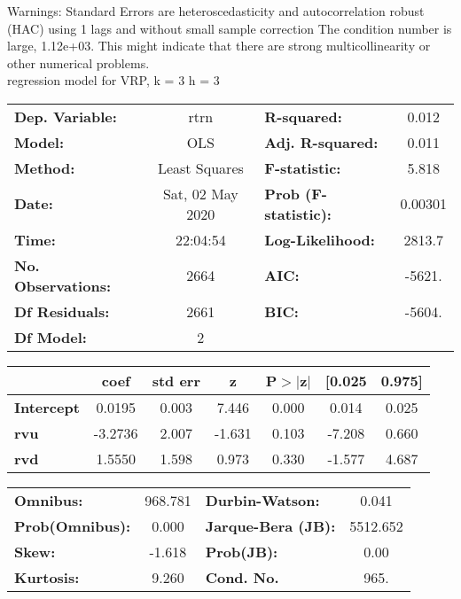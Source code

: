 Warnings: \newline
 [1] Standard Errors are heteroscedasticity and autocorrelation robust (HAC) using 1 lags and without small sample correction \newline
 [2] The condition number is large, 1.12e+03. This might indicate that there are \newline
 strong multicollinearity or other numerical problems.\\ 

regression model for VRP, k = 3 h = 3\begin{center}
\begin{tabular}{lclc}
\toprule
\textbf{Dep. Variable:}    &       rtrn       & \textbf{  R-squared:         } &     0.012   \\
\textbf{Model:}            &       OLS        & \textbf{  Adj. R-squared:    } &     0.011   \\
\textbf{Method:}           &  Least Squares   & \textbf{  F-statistic:       } &     5.818   \\
\textbf{Date:}             & Sat, 02 May 2020 & \textbf{  Prob (F-statistic):} &  0.00301    \\
\textbf{Time:}             &     22:04:54     & \textbf{  Log-Likelihood:    } &    2813.7   \\
\textbf{No. Observations:} &        2664      & \textbf{  AIC:               } &    -5621.   \\
\textbf{Df Residuals:}     &        2661      & \textbf{  BIC:               } &    -5604.   \\
\textbf{Df Model:}         &           2      & \textbf{                     } &             \\
\bottomrule
\end{tabular}
\begin{tabular}{lcccccc}
                   & \textbf{coef} & \textbf{std err} & \textbf{z} & \textbf{P$> |$z$|$} & \textbf{[0.025} & \textbf{0.975]}  \\
\midrule
\textbf{Intercept} &       0.0195  &        0.003     &     7.446  &         0.000        &        0.014    &        0.025     \\
\textbf{rvu}       &      -3.2736  &        2.007     &    -1.631  &         0.103        &       -7.208    &        0.660     \\
\textbf{rvd}       &       1.5550  &        1.598     &     0.973  &         0.330        &       -1.577    &        4.687     \\
\bottomrule
\end{tabular}
\begin{tabular}{lclc}
\textbf{Omnibus:}       & 968.781 & \textbf{  Durbin-Watson:     } &    0.041  \\
\textbf{Prob(Omnibus):} &   0.000 & \textbf{  Jarque-Bera (JB):  } & 5512.652  \\
\textbf{Skew:}          &  -1.618 & \textbf{  Prob(JB):          } &     0.00  \\
\textbf{Kurtosis:}      &   9.260 & \textbf{  Cond. No.          } &     965.  \\
\bottomrule
\end{tabular}
\end{center}

